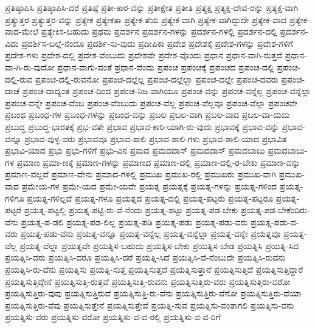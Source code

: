 {ಪ್ರತಿಷ್ಠಾಪಿಸಿ
ಪ್ರತಿಷ್ಠಾಪಿಸಿ-ದರೆ
ಪ್ರತಿಷ್ಠೆ
ಪ್ರತೀ-ಕಾರ-ವನ್ನು
ಪ್ರತೀಕ್ಷೇತ
ಪ್ರತೀತಿ
ಪ್ರತ್ಯಕ್ಷ
ಪ್ರತ್ಯಕ್ಷ-ದೇವ-ರನ್ನು
ಪ್ರತ್ಯಕ್ಷ-ವಾಗಿ
ಪ್ರತ್ಯುತ್ತರ
ಪ್ರತ್ಯುತ್ತರ-ವನ್ನು
ಪ್ರತ್ಯೇಕ
ಪ್ರತ್ಯೇಕತಾ
ಪ್ರತ್ಯೇಕ-ತೆಯ
ಪ್ರತ್ಯೇಕ-ವಾಗಿ
ಪ್ರತ್ಯೇಕ-ವಾಗಿದ್ದುದೇ
ಪ್ರತ್ಯೇಕ-ವಾದ
ಪ್ರತ್ಯೇಕ-ವಾದ-ಮೇಲೆ
ಪ್ರತ್ಯೇಕಿಸ-ಬಹುದು
ಪ್ರಥಮ
ಪ್ರದರ್ಶನ
ಪ್ರದರ್ಶನ-ಗಳನ್ನು
ಪ್ರದರ್ಶನ-ಗಳಲ್ಲಿ
ಪ್ರದರ್ಶನ-ದಲ್ಲಿ
ಪ್ರದರ್ಶನ-ವಿದು
ಪ್ರದರ್ಶಿಸ-ಬಲ್ಲೆ-ನೆಂದೂ
ಪ್ರದರ್ಶಿ-ಸು-ವುದು
ಪ್ರದೀಪಿಕಾ
ಪ್ರದೇಶ
ಪ್ರದೇಶಕ್ಕೆ
ಪ್ರದೇಶ-ಗಳನ್ನು
ಪ್ರದೇಶ-ಗಳಿಗೆ
ಪ್ರದೇಶ-ಗಳು
ಪ್ರದೇಶ-ದಲ್ಲಿ
ಪ್ರದೇಶ-ವೆಂಬುದು
ಪ್ರದೇಶವೇ
ಪ್ರದೇಶ-ವೊಂದು
ಪ್ರಧಾನ
ಪ್ರಧಾನ-ವಾಗಿ-ರುತ್ತದೆ
ಪ್ರಧಾನ-ವಾ-ಗಿ-ರು-ವುದೋ
ಪ್ರಧಾನ-ವಾಗು-ವಂತೆ
ಪ್ರಧಾನ-ವೆಂದು
ಪ್ರಪಂಚ
ಪ್ರಪಂಚಕ್ಕೆ
ಪ್ರಪಂಚದ
ಪ್ರಪಂಚ-ದಲ್ಲಿ
ಪ್ರಪಂಚ-ದಲ್ಲಿ-ರುವ
ಪ್ರಪಂಚ-ದಲ್ಲಿ-ರುವನೋ
ಪ್ರಪಂಚ-ದಲ್ಲೆಲ್ಲ
ಪ್ರಪಂಚ-ದಲ್ಲೆಲ್ಲಾ
ಪ್ರಪಂಚ-ದಲ್ಲೇ
ಪ್ರಪಂಚ-ದವರು
ಪ್ರಪಂಚ-ದಾಚೆ
ಪ್ರಪಂಚ-ದಾದ್ಯಂತ
ಪ್ರಪಂಚ-ದಿಂದ
ಪ್ರಪಂಚ-ನಿಜ-ವಾಗಿಯೂ
ಪ್ರಪಂಚ-ವನ್ನು
ಪ್ರಪಂಚ-ವನ್ನೆಲ್ಲ
ಪ್ರಪಂಚ-ವನ್ನೆಲ್ಲಾ
ಪ್ರಪಂಚ-ವನ್ನೇ
ಪ್ರಪಂಚ-ವೆಂಬ
ಪ್ರಪಂಚ-ವೆಂಬುದು
ಪ್ರಪಂಚ-ವೆಲ್ಲ
ಪ್ರಪಂಚ-ವೆಲ್ಲವೂ
ಪ್ರಪಂಚ-ವೆಲ್ಲಾ
ಪ್ರಪಂಚವೇ
ಪ್ರಬಂಧ
ಪ್ರಬಂಧ-ಗಳ
ಪ್ರಬಂಧ-ಗಳನ್ನು
ಪ್ರಬಂಧ-ವನ್ನು
ಪ್ರಬಲ
ಪ್ರಬಲ-ವಾಗಿ
ಪ್ರಬಲ-ವಾದ
ಪ್ರಬಲ-ವಾ-ದುದು
ಪ್ರಬುದ್ಧ
ಪ್ರಬುದ್ಧ-ಭಾರತಕ್ಕೆ
ಪ್ರಭ-ವತೇ
ಪ್ರಭಾವ
ಪ್ರಭಾವ-ಕಾರಿ-ಯಾಗಿ-ರು-ವುದು
ಪ್ರಭಾವಕ್ಕೆ
ಪ್ರಭಾವ-ವನ್ನು
ಪ್ರಭಾವ-ವನ್ನೂ
ಪ್ರಭಾವ-ವುಳ್ಳ-ವರು
ಪ್ರಭಾವವೂ
ಪ್ರಭಾವ-ಶಾಲಿ
ಪ್ರಭಾವ-ಶಾಲಿ-ಗಳು
ಪ್ರಭಾವ-ಶಾಲಿ-ಯಾದ
ಪ್ರಭಾವಿತ
ಪ್ರಭಾವಿ-ಯಾದ
ಪ್ರಭು
ಪ್ರಭು-ಗಳಿಗೆ
ಪ್ರಭು-ವಿನ
ಪ್ರಮದ
ಪ್ರಮದದಾಸ್
ಪ್ರಮದದಾಸ್
ಪ್ರಮದಬಾಬು
ಪ್ರಮದಬಾಬು-ಗಳ
ಪ್ರಮಾಣ
ಪ್ರಮಾ-ಣಕ್ಕೆ
ಪ್ರಮಾಣ-ಗಳನ್ನು
ಪ್ರಮಾಣದ
ಪ್ರಮಾಣ-ದಲ್ಲಿ
ಪ್ರಮಾಣ-ದಲ್ಲಿ-ರ-ಬೇಕು
ಪ್ರಮಾಣ-ವನ್ನು
ಪ್ರಮಾಣ-ವಲ್ಲವೆ
ಪ್ರಮಾಣ-ವೇನು
ಪ್ರಮಾದ-ಗಳಲ್ಲಿ
ಪ್ರಮುಖ
ಪ್ರಮುಖ-ರಲ್ಲಿ
ಪ್ರಮುಖರು
ಪ್ರಮುಖ-ವಾಗಿ
ಪ್ರಮುಖ-ವಾದ
ಪ್ರಮೇಯ-ಗಳ
ಪ್ರಮೇ-ಯದ
ಪ್ರಮೇ-ಯವೇ
ಪ್ರಯತ್ನ
ಪ್ರಯತ್ನಕ್ಕೆ
ಪ್ರಯತ್ನ-ಗಳನ್ನು
ಪ್ರಯತ್ನ-ಗಳಿಂದ
ಪ್ರಯತ್ನ-ಗಳಿಗೂ
ಪ್ರಯತ್ನ-ಗಳಿಲ್ಲದೆ
ಪ್ರಯತ್ನ-ಗಳೂ
ಪ್ರಯತ್ನದ
ಪ್ರಯತ್ನ-ದಲ್ಲಿ
ಪ್ರಯತ್ನ-ಪಟ್ಟರು
ಪ್ರಯತ್ನ-ಪಟ್ಟರೂ
ಪ್ರಯತ್ನ-ಪಟ್ಟರೆ
ಪ್ರಯತ್ನ-ಪಟ್ಟಲ್ಲಿ
ಪ್ರಯತ್ನ-ಪಟ್ಟಿ-ರು-ವೆ-ನೆಂದು
ಪ್ರಯತ್ನ-ಪಟ್ಟು
ಪ್ರಯತ್ನ-ಪಡ-ಬೇಕು
ಪ್ರಯತ್ನ-ಪಡ-ಬೇಕೆಂದಿರು-ವೆನು
ಪ್ರಯತ್ನ-ಪ-ಡಲಿ
ಪ್ರಯತ್ನ-ಪಡ-ಲಿಲ್ಲ
ಪ್ರಯತ್ನ-ಪಡಿ
ಪ್ರಯತ್ನ-ಪಡು
ಪ್ರಯತ್ನ-ಪಡು-ವರು
ಪ್ರಯತ್ನ-ಪಡು-ವ-ವರು
ಪ್ರಯತ್ನ-ಪಡು-ವೆನು
ಪ್ರಯತ್ನ-ವನ್ನೂ
ಪ್ರಯತ್ನ-ವನ್ನೆಲ್ಲ
ಪ್ರಯತ್ನ-ವನ್ನೆಲ್ಲಾ
ಪ್ರಯತ್ನ-ವನ್ನೇ
ಪ್ರಯತ್ನವೂ
ಪ್ರಯತ್ನ-ವೆಲ್ಲ
ಪ್ರಯತ್ನ-ವೆಲ್ಲಾ
ಪ್ರಯತ್ನವೇ
ಪ್ರಯತ್ನಿಸ-ಬಹುದು
ಪ್ರಯತ್ನಿಸ-ಬೇಕು
ಪ್ರಯತ್ನಿಸ-ಬೇಡ
ಪ್ರಯತ್ನಿಸಿ
ಪ್ರಯತ್ನಿ-ಸಿದ
ಪ್ರಯತ್ನಿಸಿ-ದರು
ಪ್ರಯತ್ನಿಸಿ-ದರೂ
ಪ್ರಯತ್ನಿಸಿ-ದರೆ
ಪ್ರಯತ್ನಿ-ಸಿದೆ
ಪ್ರಯತ್ನಿಸಿ-ದೆ-ನೆಂಬುದೇ
ಪ್ರಯತ್ನಿಸಿ-ರುವನು
ಪ್ರಯತ್ನಿಸಿ-ರು-ವೆನು
ಪ್ರಯತ್ನಿಸು
ಪ್ರಯತ್ನಿ-ಸುತ್ತ
ಪ್ರಯತ್ನಿಸುತ್ತದೆ
ಪ್ರಯತ್ನಿಸುತ್ತಾನೆ
ಪ್ರಯತ್ನಿಸುತ್ತಿದೆ
ಪ್ರಯತ್ನಿಸುತ್ತಿದ್ದಾರೆ
ಪ್ರಯತ್ನಿಸುತ್ತಿದ್ದೇನೆ
ಪ್ರಯತ್ನಿಸುತ್ತಿ-ರುತ್ತವೆ
ಪ್ರಯತ್ನಿಸುತ್ತಿ-ರುವನು
ಪ್ರಯತ್ನಿಸುತ್ತಿರು-ವರು
ಪ್ರಯತ್ನಿಸುತ್ತಿರು-ವರೋ
ಪ್ರಯತ್ನಿಸುತ್ತಿರು-ವುವು
ಪ್ರಯತ್ನಿಸುತ್ತಿರುವೆ
ಪ್ರಯತ್ನಿಸುತ್ತಿ-ರು-ವೆನು
ಪ್ರಯತ್ನಿಸುತ್ತಿರು-ವೆನೋ
ಪ್ರಯತ್ನಿಸುತ್ತಿರು-ವೆಯಾ
ಪ್ರಯತ್ನಿಸುತ್ತಿರು-ವೆವು
ಪ್ರಯತ್ನಿಸುತ್ತೇನೆ
ಪ್ರಯತ್ನಿಸುತ್ತೇವೆ
ಪ್ರಯತ್ನಿ-ಸುವ
ಪ್ರಯತ್ನಿಸು-ವಂತಾಗಲಿ
ಪ್ರಯತ್ನಿಸು-ವನು
ಪ್ರಯತ್ನಿಸು-ವರು
ಪ್ರಯತ್ನಿಸು-ವರೋ
ಪ್ರಯತ್ನಿಸು-ವ-ವ-ರಲ್ಲಿ
ಪ್ರಯತ್ನಿಸು-ವ-ವ-ರಿಗೆ
}
